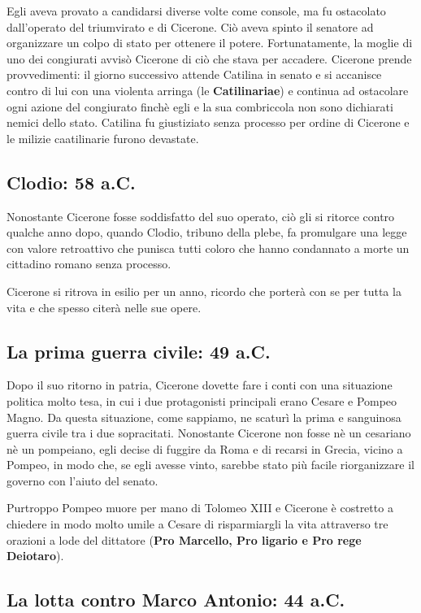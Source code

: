 \documentclass[10pt,a4paper]{article}
\begin{document}
 Egli aveva provato a candidarsi diverse volte come console, ma fu ostacolato dall'operato del triumvirato e di Cicerone. Ciò aveva spinto il senatore ad organizzare un colpo di stato per ottenere il potere. Fortunatamente, la moglie di uno dei congiurati avvisò Cicerone di ciò che stava per accadere. Cicerone prende provvedimenti: il giorno successivo attende Catilina in senato e si accanisce contro di lui con una violenta arringa (le \textbf{Catilinariae}) e continua ad ostacolare ogni azione del congiurato finchè egli e la sua combriccola non sono dichiarati nemici dello stato. Catilina fu giustiziato senza processo per ordine di Cicerone e le milizie caatilinarie furono devastate. 
 
 \subsection*{Clodio: 58 a.C.}
 
 Nonostante Cicerone fosse soddisfatto del suo operato, ciò gli si ritorce contro qualche anno dopo, quando Clodio, tribuno della plebe, fa promulgare una legge con valore retroattivo che punisca tutti coloro che hanno condannato a morte un cittadino romano senza processo.

Cicerone si ritrova in esilio per un anno, ricordo che porterà con se per tutta la vita e che spesso citerà nelle sue opere.

\subsection*{La prima guerra civile: 49 a.C.}

Dopo il suo ritorno in patria, Cicerone dovette fare i conti con una situazione politica molto tesa, in cui i due protagonisti principali erano Cesare e Pompeo Magno. Da questa situazione, come sappiamo, ne scaturì la prima e sanguinosa guerra civile tra i due sopracitati. Nonostante Cicerone non fosse nè un cesariano nè un pompeiano, egli decise di fuggire da Roma e di recarsi in Grecia, vicino a Pompeo, in modo che, se egli avesse vinto, sarebbe stato più facile riorganizzare il governo con l'aiuto del senato. 

Purtroppo Pompeo muore per mano di Tolomeo XIII e Cicerone è costretto a chiedere in modo molto umile a Cesare di risparmiargli la vita attraverso tre orazioni a lode del dittatore (\textbf{Pro Marcello, Pro ligario e Pro rege Deiotaro}).

\subsection*{La lotta contro Marco Antonio: 44 a.C.}
\end{document}

